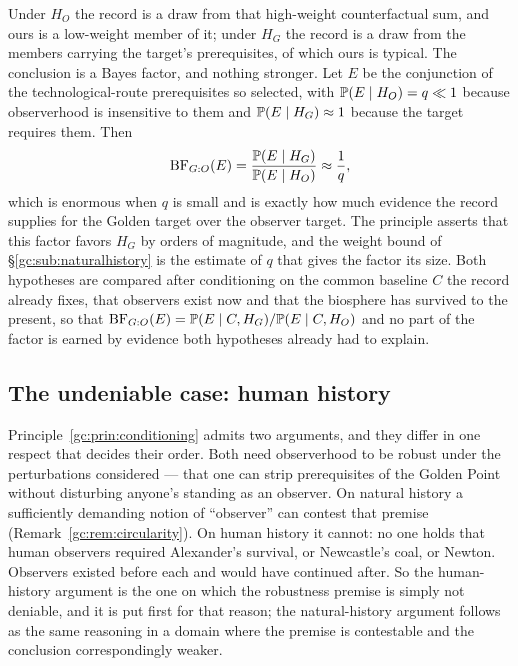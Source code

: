 \begin{principle}
Under $H_O$ the record is a draw from that high-weight counterfactual
sum, and ours is a low-weight member of it; under $H_G$ the record is a
draw from the members carrying the target's prerequisites, of which ours
is typical. The conclusion is a Bayes factor, and nothing stronger. Let $E$ be the
conjunction of the technological-route prerequisites so selected, with
$\mathbb{P}(E\mid H_O)=q\ll1$ because observerhood is insensitive to them and
$\mathbb{P}(E\mid H_G)\approx1$ because the target requires them. Then
\begin{equation}\label{gc:eq:bfGO}
\mathrm{BF}_{G:O}(E)=\frac{\mathbb{P}(E\mid H_G)}{\mathbb{P}(E\mid H_O)}\approx\frac1q,
\end{equation}
which is enormous when $q$ is small and is exactly how much evidence
the record supplies for the Golden target over the observer target.
The principle asserts that this factor favors $H_G$ by orders of
magnitude, and the weight bound of \S\ref{gc:sub:naturalhistory} is
the estimate of $q$ that gives the factor its size. Both hypotheses are
compared after conditioning on the common baseline $C$ the record
already fixes, that observers exist now and that the biosphere has
survived to the present, so that $\mathrm{BF}_{G:O}(E)=\mathbb{P}(E\mid
C,H_G)/\mathbb{P}(E\mid C,H_O)$ and no part of the factor is earned by
evidence both hypotheses already had to explain.
\end{principle}

\subsection{The undeniable case: human history}\label{gc:sub:humanhistory}

Principle~\ref{gc:prin:conditioning} admits two arguments, and they
differ in one respect that decides their order. Both need observerhood
to be robust under the perturbations considered --- that one can strip
prerequisites of the Golden Point without disturbing anyone's standing
as an observer. On natural history a sufficiently demanding notion of
``observer'' can contest that premise (Remark~\ref{gc:rem:circularity}).
On human history it cannot: no one holds that human observers required
Alexander's survival, or Newcastle's coal, or Newton. Observers existed
before each and would have continued after. So the human-history
argument is the one on which the robustness premise is simply not
deniable, and it is put first for that reason; the natural-history
argument follows as the same reasoning in a domain where the premise is
contestable and the conclusion correspondingly weaker.

